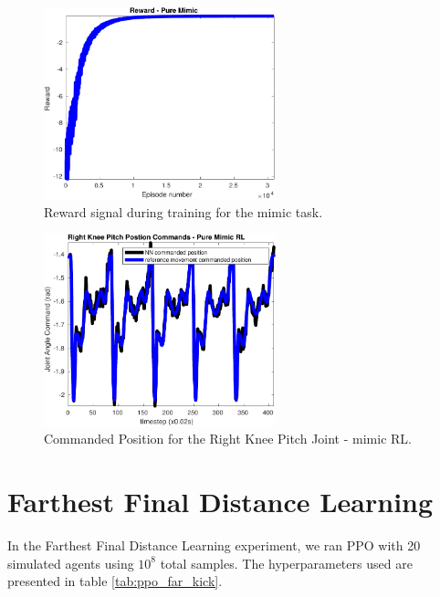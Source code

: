 \begin{figure}[H]
    \centering
    \includegraphics[width=0.6\textwidth]{Chapter7/plots/plot_reward_mimic.pdf} 
    \caption{Reward signal during training for the mimic task.}
    \label{fig:RL_mimic_reward}
\end{figure}

\begin{figure}[H]
    \centering
    \includegraphics[width=0.6\textwidth]{Chapter7/plots/plot_joints_pos_mimic.pdf} 
    \caption{Commanded Position for the Right Knee Pitch Joint - mimic RL.}
    \label{fig:RL_cmd_pos}
\end{figure}

\section{Farthest Final Distance Learning}
\label{sec:far_kick_results}

In the Farthest Final Distance Learning experiment, we ran PPO with 20 simulated agents using $10^8$ total samples. The hyperparameters used are presented in table \ref{tab:ppo_far_kick}.

